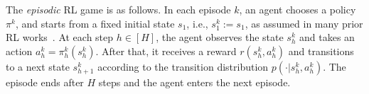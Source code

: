 \documentclass{article} %
\newcommand{\cA}{\mathcal{A}}
\newcommand{\cS}{\mathcal{S}}
\newcommand{\longbo}[1]{}
\newcommand{\yihan}[1]{}
\newcommand{\siwei}[1]{}
\newcommand{\longbo}[1]{{\color{red}  [\text{Longbo:} #1]}}
\newcommand{\yihan}[1]{{\color{teal} [\text{Yihan:} #1]}}
\newcommand{\siwei}[1]{{\color{brown} [\text{Siwei:} #1]}}
\begin{document}
	The \emph{episodic} RL game is as follows. In each episode $k$, an agent chooses a policy $\pi^k$, and starts from a fixed initial state $s_1$, i.e., $s^k_1:=s_1$, as assumed in many prior RL works~\citep{fiechter1994efficient,kaufmann2021adaptive,menard2021fast}.
	At each step $h \in [H]$, the agent observes the state $s^k_h$ and takes an action $a^k_h=\pi^k_h(s^k_h)$. After that, it receives a reward $r(s^k_h,a^k_h)$ and  transitions to a next state $s^k_{h+1}$ according to the transition distribution $p(\cdot|s^k_h,a^k_h)$. 
	The episode ends after $H$ steps and the agent enters the next episode. 
	
\end{document}
